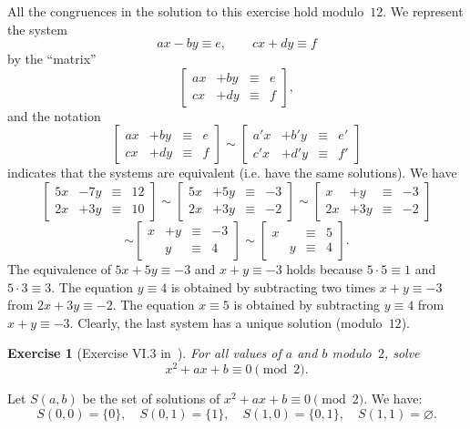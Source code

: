 \documentclass[12pt,letterpaper]{article}
\newtheorem{exer}[thm]{Exercise}
\theoremstyle{definition}
\begin{document}
All the congruences in the solution to this exercise hold modulo~$12$. We represent the system 
\[
ax-by\equiv e, \qquad cx+dy\equiv f
\] 
by the ``matrix'' 
$$ 
\begin{bmatrix}
ax & +by & \equiv & e\\
cx & +dy & \equiv & f
\end{bmatrix},
$$ 
and the notation 
$$ 
\begin{bmatrix}
ax & +by & \equiv & e\\
cx & +dy & \equiv & f
\end{bmatrix}
\sim
\begin{bmatrix}
a'x & +b'y & \equiv & e'\\
c'x & +d'y & \equiv & f'
\end{bmatrix}
$$ 
indicates that the systems are equivalent (i.e. have the same solutions). We have 
$$
\begin{bmatrix}
5x & -7y & \equiv & 12\\
2x & +3y & \equiv & 10
\end{bmatrix} 
\sim 
\begin{bmatrix}
5x & +5y & \equiv & -3\\
2x & +3y & \equiv & -2
\end{bmatrix} 
\sim 
\begin{bmatrix}
x & +y & \equiv & -3\\
2x & +3y & \equiv & -2
\end{bmatrix} 
$$ 
$$
\sim
\begin{bmatrix}
x & +y & \equiv & -3\\
  & y & \equiv & 4
\end{bmatrix} 
\sim 
\begin{bmatrix}
x &   & \equiv & 5\\
  & y & \equiv & 4
\end{bmatrix}.
$$ 
The equivalence of $5x+5y\equiv-3$ and $x+y\equiv-3$ holds because $5 \cdot 5\equiv 1$ and $5 \cdot 3 \equiv 3$. The equation $y \equiv 4$ is obtained by subtracting two times $x+y\equiv-3$ from $2x+3y\equiv-2$. The equation $x \equiv 5$ is obtained by subtracting $y\equiv4$ from $x+y\equiv-3$. Clearly, the last system has a unique solution (modulo~$12$). 

\begin{exer}[Exercise VI.3 in~\cite{weil1979}]
For all values of $a$ and $b$ modulo~$2$, solve
\[
x^2+ax+b\equiv 0\pmod 2.
\]
\end{exer}

Let $S(a,b)$ be the set of solutions of $x^2+ax+b\equiv 0\pmod 2$. We have: 
$$
S(0,0)=\{0\},\quad S(0,1)=\{1\},\quad S(1,0)=\{0,1\},\quad S(1,1)=\varnothing.
$$ 
\end{document}
